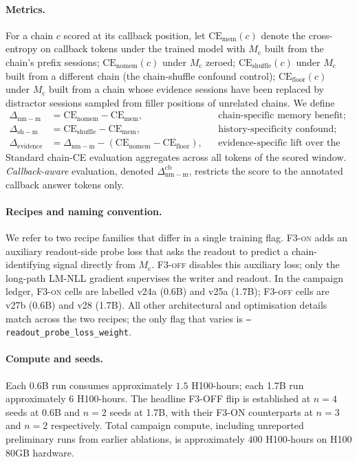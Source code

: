 \documentclass{article}
\newcommand{\Mc}{M_{\mathrm{c}}}
\newcommand{\dnm}{\Delta_{\mathrm{nm-m}}}
\newcommand{\dsh}{\Delta_{\mathrm{sh-m}}}
\newcommand{\CEmem}{\mathrm{CE}_{\mathrm{mem}}}
\newcommand{\CEnomem}{\mathrm{CE}_{\mathrm{nomem}}}
\newcommand{\CEsh}{\mathrm{CE}_{\mathrm{shuffle}}}
\newcommand{\CEfloor}{\mathrm{CE}_{\mathrm{floor}}}
\newcommand{\elift}{\Delta_{\mathrm{evidence}}}
\begin{document}
\paragraph{Metrics.}  For a chain $c$ scored at its callback
position, let $\CEmem(c)$ denote the cross-entropy on callback
tokens under the trained model with $\Mc$ built from the chain's
prefix sessions; $\CEnomem(c)$ under $\Mc$ zeroed; $\CEsh(c)$ under
$\Mc$ built from a different chain (the chain-shuffle confound
control); $\CEfloor(c)$ under $\Mc$ built from a chain whose
evidence sessions have been replaced by distractor sessions sampled
from filler positions of unrelated chains.  We define
\begin{align*}
\dnm     &= \CEnomem - \CEmem,                       &&\text{chain-specific memory benefit;} \\
\dsh     &= \CEsh    - \CEmem,                       &&\text{history-specificity confound;} \\
\elift   &= \dnm     - (\CEnomem - \CEfloor),        &&\text{evidence-specific lift over the no-evidence floor.}
\end{align*}
Standard chain-CE evaluation aggregates across all tokens of the
scored window.  \emph{Callback-aware} evaluation, denoted
$\dnm^{\mathrm{cb}}$, restricts the score to the annotated callback
answer tokens only.

\paragraph{Recipes and naming convention.}  We refer to two recipe
families that differ in a single training flag.  \textsc{F3-on}
adds an auxiliary readout-side probe loss that asks the readout to
predict a chain-identifying signal directly from $\Mc$.
\textsc{F3-off} disables this auxiliary loss; only the long-path
LM-NLL gradient supervises the writer and readout.  In the campaign
ledger, \textsc{F3-on} cells are labelled v24a (0.6B) and v25a
(1.7B); \textsc{F3-off} cells are v27b (0.6B) and v28 (1.7B).  All
other architectural and optimisation details match across the two
recipes; the only flag that varies is
\texttt{--readout\_probe\_loss\_weight}.

\paragraph{Compute and seeds.}  Each 0.6B run consumes approximately
$1.5$ H100-hours; each 1.7B run approximately $6$ H100-hours.  The
headline F3-OFF flip is established at $n=4$ seeds at 0.6B and
$n=2$ seeds at 1.7B, with their F3-ON counterparts at $n=3$ and
$n=2$ respectively.  Total campaign compute, including unreported
preliminary runs from earlier ablations, is approximately $400$
H100-hours on H100 80GB hardware.
\end{document}
